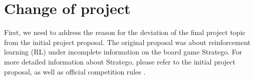 \documentclass{article}
\begin{document}



\printAffiliationsAndNotice{}  %

\section{Change of project}
First, we need to address the reason for the deviation of the final project topic from the initial project proposal. The original proposal was about reinforcement learning (RL) under incomplete information on the board game Stratego. For more detailed information about Stratego, please refer to the initial project proposal, as well as official competition rules \cite{ISFrules}. 
\end{document}
